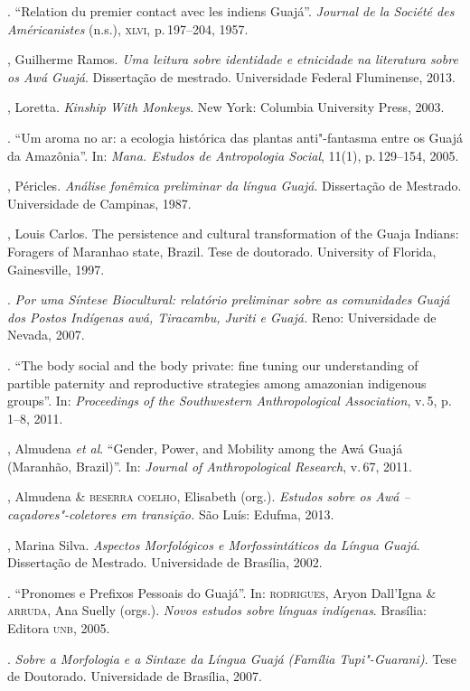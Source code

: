 \begin{bibliohedra}
\titidem. ``Relation du premier contact avec les indiens
Guajá''. \emph{Journal de la Société des Américanistes} (n.s.), \textsc{xlvi}, p.\,197--204, 1957.

, Guilherme Ramos. \emph{Uma leitura sobre identidade e
etnicidade na literatura sobre os Awá Guajá}. Dissertação de mestrado.
Universidade Federal Fluminense, 2013.

, Loretta. \emph{Kinship With Monkeys}. New York: Columbia
University Press, 2003.

\titidem. ``Um aroma no ar: a ecologia histórica das
plantas anti"-fantasma entre os Guajá da Amazônia''. In: \emph{Mana.
Estudos de Antropologia Social}, 11(1), p.\,129--154, 2005.

, Péricles. \emph{Análise fonêmica preliminar da língua
Guajá}. Dissertação de Mestrado. Universidade de Campinas, 1987.

, Louis Carlos. The persistence and cultural transformation
of the Guaja Indians: Foragers of Maranhao state, Brazil. Tese de
doutorado. University of Florida, Gainesville, 1997.

\titidem. \emph{Por uma Síntese Biocultural:
relatório preliminar sobre as comunidades Guajá dos Postos Indígenas
awá, Tiracambu, Juriti e Guajá.} Reno: Universidade de Nevada, 2007.

\titidem. ``The body social and the body private: fine
tuning our understanding of partible paternity and reproductive
strategies among amazonian indigenous groups''. In: \emph{Proceedings of
the Southwestern Anthropological Association}, v.\,5, p.\,1--8, 2011.

, Almudena \emph{et al}. ``Gender, Power, and Mobility among the Awá Guajá
(Maranhão, Brazil)''. In: \emph{Journal of Anthropological Research}, v.\,67, 2011.

, Almudena \& \textsc{beserra coelho}, Elisabeth (org.).
\emph{Estudos sobre os Awá -- caçadores"-coletores em transição.} São
Luís: Edufma, 2013.

, Marina Silva. \emph{Aspectos Morfológicos e
Morfossintáticos da Língua Guajá}. Dissertação de Mestrado. Universidade
de Brasília, 2002.

\titidem. ``Pronomes e Prefixos Pessoais do Guajá''. In: \textsc{rodrigues}, Aryon Dall'Igna \& \textsc{arruda}, Ana Suelly (orgs.).
\emph{Novos estudos sobre línguas indígenas}. Brasília: Editora \textsc{unb}, 2005.

\titidem. \emph{Sobre a Morfologia e a Sintaxe da
Língua Guajá (Família Tupi"-Guarani)}. Tese de Doutorado. Universidade de
Brasília, 2007.


\end{bibliohedra}
